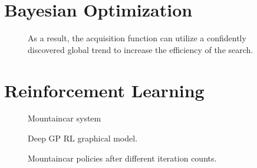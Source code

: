 \section{Bayesian Optimization}
\begin{figure}[t]
    \centering
    \caption{
        \label{fig:bo:posterior}
        As a result, the acquisition function can utilize a confidently discovered global trend to increase the efficiency of the search.
    }
\end{figure}


\section{Reinforcement Learning}
\begin{figure}[t]
    \centering
    
    \caption{
        \label{fig:mountaincar:system}
        Mountaincar system
    }
\end{figure}
\begin{figure}[t]
    \centering
    
    \caption{
        \label{fig:mountaincar:graphical_model}
        Deep GP RL graphical model.
    }
\end{figure}
\begin{figure}[tp]
    \centering
    
    
    
    \caption{
        \label{fig:mountaincar:policy}
        Mountaincar policies after different iteration counts.
    }
\end{figure}
